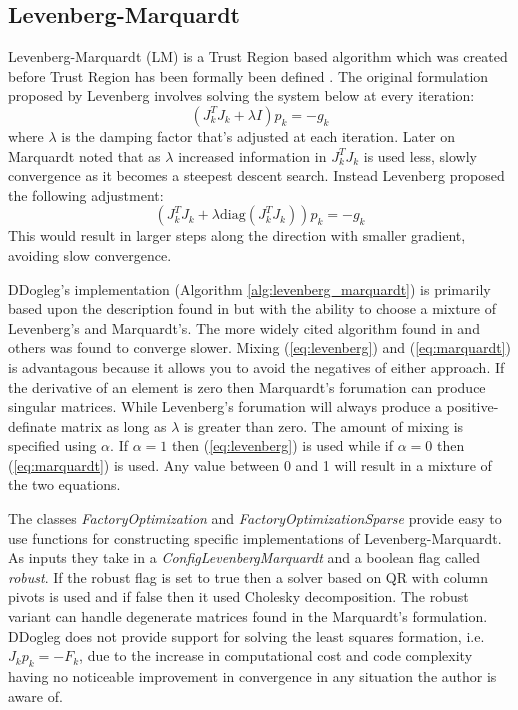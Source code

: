 \documentclass[peerreview,compsoc,onecolumn]{IEEEtran}
\begin{document}
\subsection{Levenberg-Marquardt}

Levenberg-Marquardt (LM) is a Trust Region based algorithm which was created before Trust Region has been formally been defined \cite{numopt2006,fletcher1987,dennis1996}. The original formulation proposed by Levenberg \cite{levenberg1944} involves solving the system below at every iteration:
\begin{equation}
\label{eq:levenberg}
(J_k^T J_k + \lambda I) p_k = -g_k
\end{equation} 
where $\lambda$ is the damping factor that's adjusted at each iteration. Later on Marquardt \cite{marquardt1963} noted that as $\lambda$ increased information in $J_k^T J_k$ is used less, slowly convergence as it becomes a steepest descent search. Instead Levenberg proposed the following adjustment:
\begin{equation}
\label{eq:marquardt}
(J_k^T J_k + \lambda \mbox{diag}(J_k^T J_k)) p_k = -g_k
\end{equation} 
This would result in larger steps along the direction with smaller gradient, avoiding slow convergence.

DDogleg's implementation (Algorithm \ref{alg:levenberg_marquardt}) is primarily based upon the description found in \cite{IMM2004} but with the ability to choose a mixture of Levenberg's and Marquardt's. The more widely cited algorithm found in \cite{fletcher1987} and others was found to converge slower. Mixing (\ref{eq:levenberg}) and (\ref{eq:marquardt}) is advantagous because it allows you to avoid the negatives of either approach. If the derivative of an element is zero then Marquardt's forumation can produce singular matrices. While Levenberg's forumation will always produce a positive-definate matrix as long as $\lambda$ is greater than zero. The amount of mixing is specified using $\alpha$. If $\alpha=1$ then (\ref{eq:levenberg}) is used while if $\alpha=0$ then (\ref{eq:marquardt}) is used. Any value between 0 and 1 will result in a mixture of the two equations.

The classes \emph{FactoryOptimization} and \emph{FactoryOptimizationSparse} provide easy to use functions for constructing specific implementations of Levenberg-Marquardt. As inputs they take in a \emph{ConfigLevenbergMarquardt} and a boolean flag called \emph{robust}. If the robust flag is set to true then a solver based on QR with column pivots is used and if false then it used Cholesky decomposition. The robust variant can handle degenerate matrices found in the Marquardt's formulation. DDogleg does not provide support for solving the least squares formation, i.e. $J_k p_k = -F_k$, due to the increase in computational cost and code complexity having no noticeable improvement in convergence in any situation the author is aware of.
\end{document}
